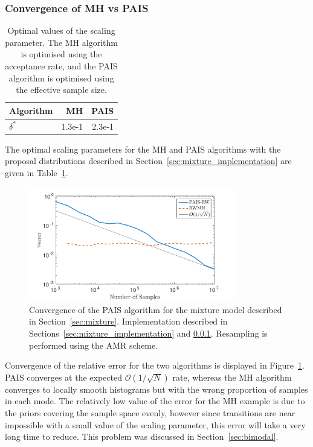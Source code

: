 \documentclass[final]{siamltex}
\begin{document}
\subsubsection{Convergence of MH vs PAIS}\label{sec:mixture_conv}

\begin{table}[!htb]
      \centering
        \begin{tabular}{|l|r|r|}
	\hline
	Algorithm	& MH & PAIS \\ \hline
	$\delta^*$	& 1.3e-1     & 2.3e-1 \\
	\hline
	\end{tabular}
	\vspace{1mm}
	\caption{Optimal values of the scaling parameter. The MH algorithm is optimised using the acceptance rate, and the PAIS algorithm is optimised using the effective sample size.}
	\label{table:mixture_opt_beta}
\end{table}

The optimal scaling parameters for the MH and PAIS algorithms with the proposal distributions described in Section~\ref{sec:mixture_implementation} are given in Table~\ref{table:mixture_opt_beta}.

\begin{figure}[htb]
\centering
\includegraphics[width=0.8\textwidth]{"figures/Mode_proportions"}
\caption{Convergence of the PAIS algorithm for the mixture model described in Section~\ref{sec:mixture}. Implementation described in Sections~\ref{sec:mixture_implementation} and \ref{sec:mixture_conv}. Resampling is performed using the AMR scheme.}
\label{fig:mixture_modes}
\end{figure}

Convergence of the relative error for the two algorithms is displayed in Figure~\ref{fig:mixture_modes}. PAIS converges at the expected $\mathcal{O}(1/\sqrt{N})$ rate, whereas the MH algorithm converges to locally smooth histograms but with the wrong proportion of samples in each mode. The relatively low value of the error for the MH example is due to the priors covering the sample space evenly, however since transitions are near impossible with a small value of the scaling parameter, this error will take a very long time to reduce. This problem was discussed in Section~\ref{sec:bimodal}.
\end{document}
